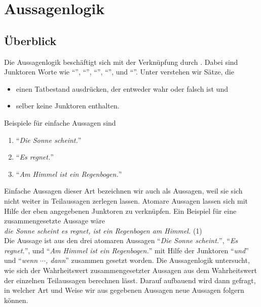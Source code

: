 \chapter{Aussagenlogik}
\section{Überblick}
Die Aussagenlogik beschäftigt sich mit der Verknüpfung  durch
.  Dabei sind Junktoren Worte wie ``'', ``'',
``'', ``'', und ``''.  Unter
 verstehen wir Sätze, die 
\begin{itemize}
\item einen Tatbestand ausdrücken, der entweder wahr oder falsch ist und 
\item selber keine Junktoren enthalten.
\end{itemize}
Beispiele für einfache Aussagen sind
\begin{enumerate}
\item ``\textsl{Die Sonne scheint.}''
\item ``\textsl{Es regnet.}''
\item ``\textsl{Am Himmel ist ein Regenbogen.}''
\end{enumerate}
Einfache Aussagen dieser Art bezeichnen wir auch als  Aussagen, weil sie
sich nicht weiter in 
Teilaussagen zerlegen lassen.  Atomare Aussagen lassen sich mit Hilfe der eben angegebenen Junktoren zu 
 verknüpfen.  Ein Beispiel für eine
zusammengesetzte Aussage wäre \\[0.2cm] 
\hspace*{1.3cm} \textsl{ die Sonne scheint  es regnet,  ist ein Regenbogen am Himmel.} 
\hspace*{\fill} (1)
\\[0.2cm]
Die Aussage ist aus den drei atomaren Aussagen ``\textsl{Die Sonne scheint.}'', ``\textsl{Es regnet.}'', und
``\textsl{Am Himmel ist ein Regenbogen.}'' mit Hilfe der Junktoren ``\textsl{und}'' und
``\textsl{wenn $\cdots$, dann}'' zusammen gesetzt worden.
Die Aussagenlogik untersucht, wie sich der Wahrheitswert zusammengesetzter Aussagen
aus dem Wahrheitswert der einzelnen Teilaussagen berechnen lässt.  Darauf
aufbauend wird dann gefragt, in welcher Art und Weise wir aus gegebenen Aussagen neue 
Aussagen folgern können.

